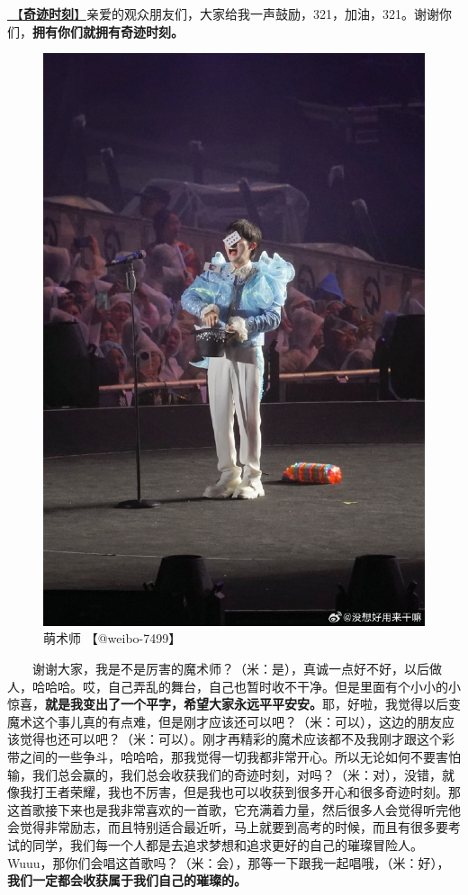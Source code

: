 \documentclass[]{ctexbook}
\begin{document}
\hyperref[magic-moment]{🎵【\textbf{奇迹时刻}】}亲爱的观众朋友们，大家给我一声鼓励，321，加油，321。谢谢你们，\textbf{拥有你们就拥有奇迹时刻。}

\begin{figure}

{\centering \includegraphics[width=400pt]{img/shenzhen20240601/001} 

}

\caption{萌术师 【@weibo-7499】}\label{fig:unnamed-chunk-43}
\end{figure}

  谢谢大家，我是不是厉害的魔术师？（米：是），真诚一点好不好，以后做人，哈哈哈。哎，自己弄乱的舞台，自己也暂时收不干净。但是里面有个小小的小惊喜，\textbf{就是我变出了一个平字，希望大家永远平平安安。}耶，好啦，我觉得以后变魔术这个事儿真的有点难，但是刚才应该还可以吧？（米：可以），这边的朋友应该觉得也还可以吧？（米：可以）。刚才再精彩的魔术应该都不及我刚才跟这个彩带之间的一些争斗，哈哈哈，那我觉得一切我都非常开心。所以无论如何不要害怕输，我们总会赢的，我们总会收获我们的奇迹时刻，对吗？（米：对），没错，就像我打王者荣耀，我也不厉害，但是我也可以收获到很多开心和很多奇迹时刻。那这首歌接下来也是我非常喜欢的一首歌，它充满着力量，然后很多人会觉得听完他会觉得非常励志，而且特别适合最近听，马上就要到高考的时候，而且有很多要考试的同学，我们每一个人都是去追求梦想和追求更好的自己的璀璨冒险人。Wuuu，那你们会唱这首歌吗？（米：会），那等一下跟我一起唱哦，（米：好），\textbf{我们一定都会收获属于我们自己的璀璨的。}
\end{document}
